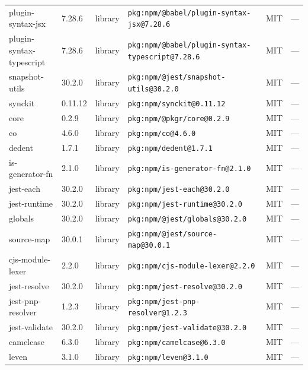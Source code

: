 \documentclass[11pt,a4paper]{article}
\begin{document}
\begin{longtable}{|p{4cm}|p{2cm}|p{1.6cm}|p{5cm}|p{1.5cm}|p{3.5cm}|}
\raggedright plugin-syntax-jsx & 7.28.6 & library & \small\texttt{pkg:npm/@babel/plugin-syntax-jsx@7.28.6} & MIT & \small — \\
\raggedright plugin-syntax-typescript & 7.28.6 & library & \small\texttt{pkg:npm/@babel/plugin-syntax-typescript@7.28.6} & MIT & \small — \\
\raggedright snapshot-utils & 30.2.0 & library & \small\texttt{pkg:npm/@jest/snapshot-utils@30.2.0} & MIT & \small — \\
\raggedright synckit & 0.11.12 & library & \small\texttt{pkg:npm/synckit@0.11.12} & MIT & \small — \\
\raggedright core & 0.2.9 & library & \small\texttt{pkg:npm/@pkgr/core@0.2.9} & MIT & \small — \\
\raggedright co & 4.6.0 & library & \small\texttt{pkg:npm/co@4.6.0} & MIT & \small — \\
\raggedright dedent & 1.7.1 & library & \small\texttt{pkg:npm/dedent@1.7.1} & MIT & \small — \\
\raggedright is-generator-fn & 2.1.0 & library & \small\texttt{pkg:npm/is-generator-fn@2.1.0} & MIT & \small — \\
\raggedright jest-each & 30.2.0 & library & \small\texttt{pkg:npm/jest-each@30.2.0} & MIT & \small — \\
\raggedright jest-runtime & 30.2.0 & library & \small\texttt{pkg:npm/jest-runtime@30.2.0} & MIT & \small — \\
\raggedright globals & 30.2.0 & library & \small\texttt{pkg:npm/@jest/globals@30.2.0} & MIT & \small — \\
\raggedright source-map & 30.0.1 & library & \small\texttt{pkg:npm/@jest/source-map@30.0.1} & MIT & \small — \\
\raggedright cjs-module-lexer & 2.2.0 & library & \small\texttt{pkg:npm/cjs-module-lexer@2.2.0} & MIT & \small — \\
\raggedright jest-resolve & 30.2.0 & library & \small\texttt{pkg:npm/jest-resolve@30.2.0} & MIT & \small — \\
\raggedright jest-pnp-resolver & 1.2.3 & library & \small\texttt{pkg:npm/jest-pnp-resolver@1.2.3} & MIT & \small — \\
\raggedright jest-validate & 30.2.0 & library & \small\texttt{pkg:npm/jest-validate@30.2.0} & MIT & \small — \\
\raggedright camelcase & 6.3.0 & library & \small\texttt{pkg:npm/camelcase@6.3.0} & MIT & \small — \\
\raggedright leven & 3.1.0 & library & \small\texttt{pkg:npm/leven@3.1.0} & MIT & \small — \\

\end{longtable}
\end{document}
